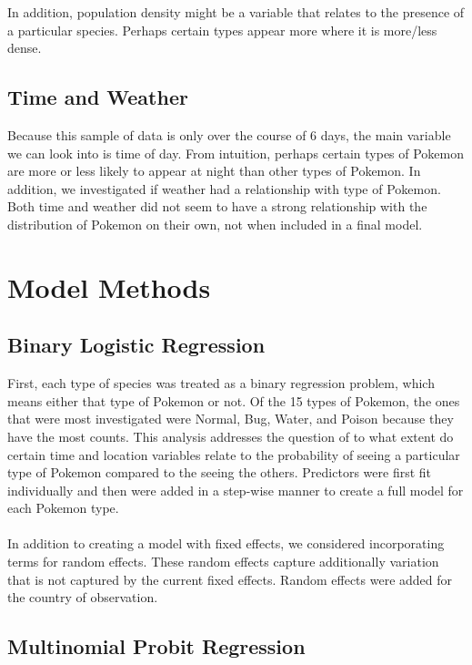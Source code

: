\documentclass{article}
\begin{document}
\noindent In addition, population density might be a variable that relates to the presence of a particular species. Perhaps certain types appear more where it is more/less dense.

\subsection{Time and Weather}

Because this sample of data is only over the course of 6 days, the main variable we can look into is time of day. From intuition, perhaps certain types of Pokemon are more or less likely to appear at night than other types of Pokemon. In addition, we investigated if weather had a relationship with type of Pokemon. Both time and weather did not seem to have a strong relationship with the distribution of Pokemon on their own, not when included in a final model.

\section{Model Methods}

\subsection{Binary Logistic Regression} 

First, each type of species was treated as a binary regression problem, which means either that type of Pokemon or not. Of the 15 types of Pokemon, the ones that were most investigated were Normal, Bug, Water, and Poison because they have the most counts. This analysis addresses the question of to what extent do certain time and location variables relate to the probability of seeing a particular type of Pokemon compared to the seeing the others. Predictors were first fit individually and then were added in a step-wise manner to create a full model for each Pokemon type. \\ 
\\ 
In addition to creating a model with fixed effects, we considered incorporating terms for random effects. These random effects capture additionally variation that is not captured by the current fixed effects. Random effects were added for the country of observation. 

\subsection{Multinomial Probit Regression}
\end{document}
